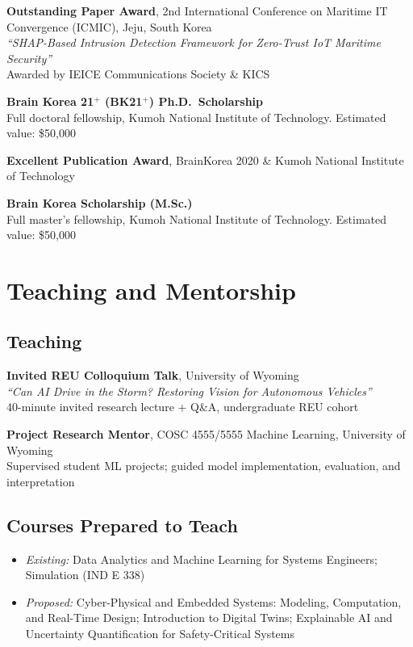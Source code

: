 \documentclass[11pt, letterpaper]{article}
\newcommand{\entry}[2]{%
  \begin{list}{}{%
    \setlength{\leftmargin}{0.17\linewidth}%
    \setlength{\labelwidth}{0.15\linewidth}%
    \setlength{\labelsep}{0.02\linewidth}%
    \setlength{\topsep}{3pt}%
    \setlength{\parsep}{2pt}%
    \setlength{\itemsep}{0pt}%
    \renewcommand{\makelabel}[1]{\parbox[t]{0.15\linewidth}{\small\raggedright\color{uwred}##1}\hfill}%
  }%
  \item[{#1}] #2%
  \end{list}%
}
\newcommand{\role}[1]{{\color{uwred}\textbf{#1}}}
\newcommand{\yearentry}[2]{%
  \begin{list}{}{%
    \setlength{\leftmargin}{0.12\linewidth}%
    \setlength{\labelwidth}{0.10\linewidth}%
    \setlength{\labelsep}{0.02\linewidth}%
    \setlength{\topsep}{2pt}%
    \setlength{\parsep}{2pt}%
    \setlength{\itemsep}{0pt}%
    \renewcommand{\makelabel}[1]{\parbox[t]{0.10\linewidth}{\small\raggedright\color{uwred}##1}\hfill}%
  }%
  \item[{#1}] #2%
  \end{list}%
}
\begin{document}
\yearentry{2023}{%
  \textbf{Outstanding Paper Award}, 2nd International Conference on Maritime IT Convergence (ICMIC), Jeju, South Korea\\
  \textit{``SHAP-Based Intrusion Detection Framework for Zero-Trust IoT Maritime Security''}\\
  Awarded by IEICE Communications Society \& KICS
}

\yearentry{2022--2025}{%
  \textbf{Brain Korea 21$^+$ (BK21$^+$) Ph.D.\ Scholarship}\\
  Full doctoral fellowship, Kumoh National Institute of Technology. Estimated value: \$50,000
}

\yearentry{2021}{%
  \textbf{Excellent Publication Award}, BrainKorea 2020 \& Kumoh National Institute of Technology
}

\yearentry{2019--2021}{%
  \textbf{Brain Korea Scholarship (M.Sc.)}\\
  Full master's fellowship, Kumoh National Institute of Technology. Estimated value: \$50,000
}




\section{Teaching and Mentorship}

\subsection*{Teaching}

\entry{Jun 2026}{%
  \role{Invited REU Colloquium Talk}, University of Wyoming\\
  \textit{``Can AI Drive in the Storm? Restoring Vision for Autonomous Vehicles''}\\
  40-minute invited research lecture + Q\&A, undergraduate REU cohort
}

\entry{Mar 2026 --\\Present}{%
  \role{Project Research Mentor}, COSC 4555/5555 Machine Learning, University of Wyoming\\
  Supervised student ML projects; guided model implementation, evaluation, and interpretation
}

\subsection*{Courses Prepared to Teach}

\begin{itemize}
  \item \textit{Existing:} Data Analytics and Machine Learning for Systems Engineers; Simulation (IND E 338)
  \item \textit{Proposed:} Cyber-Physical and Embedded Systems: Modeling, Computation, and Real-Time Design; Introduction to Digital Twins; Explainable AI and Uncertainty Quantification for Safety-Critical Systems
\end{itemize}
\end{document}

